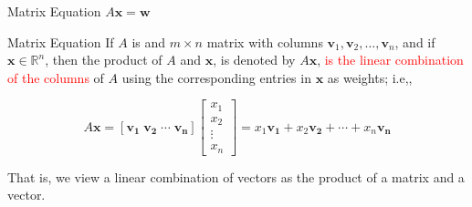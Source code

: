\documentclass[10pt, aspectratio=169]{beamer}
\begin{document}
\begin{frame}{Matrix Equation \(A\mathbf{x}=\mathbf{w}\)}
    \begin{definition}{Matrix Equation}
        If \(A\) is and \(m\times n\) matrix with columns \(\mathbf{v}_1, \mathbf{v}_2,\ldots,\mathbf{v}_n\), and if \(\mathbf{x}\in\mathbb{R}^n\), then the product of $A$ and $\mathbf{x}$, is denoted by \(A\mathbf{x}\), \textcolor{red}{is the linear combination of the columns} of \(A\) using the corresponding entries in \(\mathbf{x}\) as weights; i.e,,

        \[
    A\mathbf{x} = [\mathbf{v_1} \; \mathbf{v_2} \; \cdots \; \mathbf{v_n}]
       \begin{bmatrix}
           x_1\\
           x_2\\
           \vdots\\
           x_n
       \end{bmatrix}
       =
       x_1\mathbf{v_1} + x_2\mathbf{v_2} + \cdots + x_n\mathbf{v_n}
    \]
    \end{definition}
    That is, we view a linear combination of vectors as the product of a matrix and a vector.

    
\end{frame}
\end{document}
